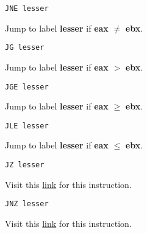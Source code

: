 \documentclass{article}
\begin{document}
\begin{Verbatim}[frame=single]
JNE lesser
\end{Verbatim}
Jump to label \textbf{lesser} if \textbf{eax} $\neq$ \textbf{ebx}.

\begin{Verbatim}[frame=single]
JG lesser
\end{Verbatim}
Jump to label \textbf{lesser} if \textbf{eax} $>$ \textbf{ebx}.

\begin{Verbatim}[frame=single]
JGE lesser
\end{Verbatim}
Jump to label \textbf{lesser} if \textbf{eax} $\geq$ \textbf{ebx}.

\begin{Verbatim}[frame=single]
JLE lesser
\end{Verbatim}
Jump to label \textbf{lesser} if \textbf{eax} $\leq$ \textbf{ebx}.

\begin{Verbatim}[frame=single]
JZ lesser
\end{Verbatim}
Visit this \href{https://www.aldeid.com/wiki/X86-assembly/Instructions/jz}{link} for this instruction.

\begin{Verbatim}[frame=single]
JNZ lesser
\end{Verbatim}
Visit this \href{https://www.aldeid.com/wiki/X86-assembly/Instructions/jnz}{link} for this instruction.
\end{document}
